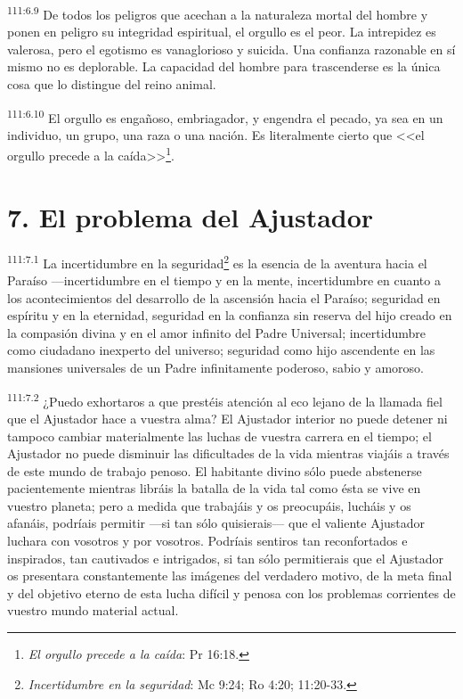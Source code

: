 \par
\textsuperscript{111:6.9} De todos los peligros que acechan a la naturaleza mortal del hombre y ponen en peligro su integridad espiritual, el orgullo es el peor. La intrepidez es valerosa, pero el egotismo es vanaglorioso y suicida. Una confianza razonable en sí mismo no es deplorable. La capacidad del hombre para trascenderse es la única cosa que lo distingue del reino animal.

\par
\textsuperscript{111:6.10} El orgullo es engañoso, embriagador, y engendra el pecado, ya sea en un individuo, un grupo, una raza o una nación. Es literalmente cierto que <<el orgullo precede a la caída>>\footnote{\textit{El orgullo precede a la caída}: Pr 16:18.}.

\section*{7. El problema del Ajustador}
\par
\textsuperscript{111:7.1} La incertidumbre en la seguridad\footnote{\textit{Incertidumbre en la seguridad}: Mc 9:24; Ro 4:20; 11:20-33.} es la esencia de la aventura hacia el Paraíso ---incertidumbre en el tiempo y en la mente, incertidumbre en cuanto a los acontecimientos del desarrollo de la ascensión hacia el Paraíso; seguridad en espíritu y en la eternidad, seguridad en la confianza sin reserva del hijo creado en la compasión divina y en el amor infinito del Padre Universal; incertidumbre como ciudadano inexperto del universo; seguridad como hijo ascendente en las mansiones universales de un Padre infinitamente poderoso, sabio y amoroso.

\par
\textsuperscript{111:7.2} ¿Puedo exhortaros a que prestéis atención al eco lejano de la llamada fiel que el Ajustador hace a vuestra alma? El Ajustador interior no puede detener ni tampoco cambiar materialmente las luchas de vuestra carrera en el tiempo; el Ajustador no puede disminuir las dificultades de la vida mientras viajáis a través de este mundo de trabajo penoso. El habitante divino sólo puede abstenerse pacientemente mientras libráis la batalla de la vida tal como ésta se vive en vuestro planeta; pero a medida que trabajáis y os preocupáis, lucháis y os afanáis, podríais permitir ---si tan sólo quisierais--- que el valiente Ajustador luchara con vosotros y por vosotros. Podríais sentiros tan reconfortados e inspirados, tan cautivados e intrigados, si tan sólo permitierais que el Ajustador os presentara constantemente las imágenes del verdadero motivo, de la meta final y del objetivo eterno de esta lucha difícil y penosa con los problemas corrientes de vuestro mundo material actual.

